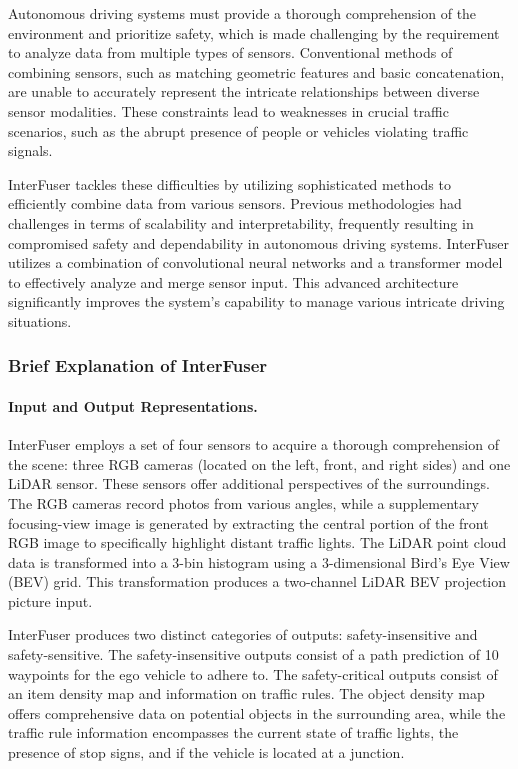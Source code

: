 Autonomous driving systems must provide a thorough comprehension of the environment and prioritize safety, which is made challenging by the requirement to analyze data from multiple types of sensors. Conventional methods of combining sensors, such as matching geometric features and basic concatenation, are unable to accurately represent the intricate relationships between diverse sensor modalities. These constraints lead to weaknesses in crucial traffic scenarios, such as the abrupt presence of people or vehicles violating traffic signals.

InterFuser \cite{shao2023safety} tackles these difficulties by utilizing sophisticated methods to efficiently combine data from various sensors. Previous methodologies had challenges in terms of scalability and interpretability, frequently resulting in compromised safety and dependability in autonomous driving systems. InterFuser utilizes a combination of convolutional neural networks and a transformer model to effectively analyze and merge sensor input. This advanced architecture significantly improves the system's capability to manage various intricate driving situations.

\subsubsection{Brief Explanation of InterFuser}

\paragraph{Input and Output Representations.} InterFuser employs a set of four sensors to acquire a thorough comprehension of the scene: three RGB cameras (located on the left, front, and right sides) and one LiDAR sensor. These sensors offer additional perspectives of the surroundings. The RGB cameras record photos from various angles, while a supplementary focusing-view image is generated by extracting the central portion of the front RGB image to specifically highlight distant traffic lights. The LiDAR point cloud data is transformed into a 3-bin histogram using a 3-dimensional Bird's Eye View (BEV) grid. This transformation produces a two-channel LiDAR BEV projection picture input.

InterFuser produces two distinct categories of outputs: safety-insensitive and safety-sensitive. The safety-insensitive outputs consist of a path prediction of 10 waypoints for the ego vehicle to adhere to. The safety-critical outputs consist of an item density map and information on traffic rules. The object density map offers comprehensive data on potential objects in the surrounding area, while the traffic rule information encompasses the current state of traffic lights, the presence of stop signs, and if the vehicle is located at a junction.


